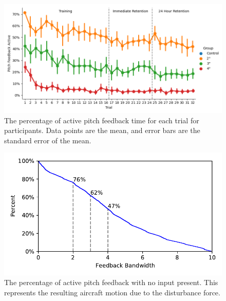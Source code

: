 \begin{figure}[tb!]
    \begin{center}
        \includegraphics[width=\linewidth]{figures/Aircraft/Bandwidth-PitchFeedbackOn.png}
        \caption[The mean percentage of active pitch feedback time for each trial]{The percentage of active pitch feedback time for each trial for participants. Data points are the mean, and error bars are the standard error of the mean.}
        \label{figure-bw:pitchfeedback}
    \end{center}
\end{figure}
\begin{figure}[tb!]
    \begin{center}
        \includegraphics[width=\linewidth]{figures/Aircraft/no_input_feedback_on.pdf}
        \caption[The mean percentage of active pitch feedback with no input present]{The percentage of active pitch feedback with no input present. This represents the resulting aircraft motion due to the disturbance force.}
        \label{figure-aircraft:noinput_pitchfeedback}
    \end{center}
\end{figure}
